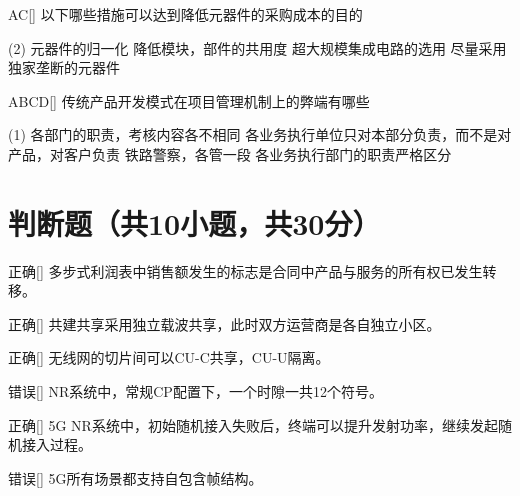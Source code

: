 \begin{choice}{\;AC\;}[]
    以下哪些措施可以达到降低元器件的采购成本的目的
    \begin{tasks}(2)
        \task 元器件的归一化
        \task 降低模块，部件的共用度
        \task 超大规模集成电路的选用
        \task 尽量采用独家垄断的元器件
    \end{tasks}
\end{choice}

\begin{choice}{\;ABCD\;}[]
    传统产品开发模式在项目管理机制上的弊端有哪些
    \begin{tasks}(1)
        \task 各部门的职责，考核内容各不相同
        \task 各业务执行单位只对本部分负责，而不是对产品，对客户负责
        \task 铁路警察，各管一段
        \task 各业务执行部门的职责严格区分
    \end{tasks}
\end{choice}




\section{判断题（共10小题，共30分）}

\begin{choice}{\;正确\;}[]
    多步式利润表中销售额发生的标志是合同中产品与服务的所有权已发生转移。
\end{choice}


\begin{choice}{\;正确\;}[]
    共建共享采用独立载波共享，此时双方运营商是各自独立小区。
\end{choice}

\begin{choice}{\;正确\;}[]
    无线网的切片间可以CU-C共享，CU-U隔离。
\end{choice}

\begin{choice}{\;错误\;}[]
    NR系统中，常规CP配置下，一个时隙一共12个符号。
\end{choice}

\begin{choice}{\;正确\;}[]
    5G NR系统中，初始随机接入失败后，终端可以提升发射功率，继续发起随机接入过程。
\end{choice}

\begin{choice}{\;错误\;}[]
    5G所有场景都支持自包含帧结构。

\end{choice}


